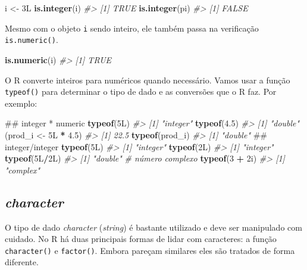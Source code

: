 \documentclass[]{book}
\newenvironment{Shaded}{\begin{snugshade}}{\end{snugshade}}
\newcommand{\KeywordTok}[1]{\textcolor[rgb]{0.13,0.29,0.53}{\textbf{#1}}}
\newcommand{\DecValTok}[1]{\textcolor[rgb]{0.00,0.00,0.81}{#1}}
\newcommand{\FloatTok}[1]{\textcolor[rgb]{0.00,0.00,0.81}{#1}}
\newcommand{\StringTok}[1]{\textcolor[rgb]{0.31,0.60,0.02}{#1}}
\newcommand{\CommentTok}[1]{\textcolor[rgb]{0.56,0.35,0.01}{\textit{#1}}}
\newcommand{\OperatorTok}[1]{\textcolor[rgb]{0.81,0.36,0.00}{\textbf{#1}}}
\newcommand{\NormalTok}[1]{#1}
\begin{document}
\begin{Shaded}
\begin{Highlighting}[]
\NormalTok{i <-}\StringTok{ }\NormalTok{3L}
\KeywordTok{is.integer}\NormalTok{(i)}
\CommentTok{#> [1] TRUE}
\KeywordTok{is.integer}\NormalTok{(pi)}
\CommentTok{#> [1] FALSE}
\end{Highlighting}
\end{Shaded}

Mesmo com o objeto \texttt{i} sendo inteiro, ele também passa na
verificação \texttt{is.numeric()}.

\begin{Shaded}
\begin{Highlighting}[]
\KeywordTok{is.numeric}\NormalTok{(i)}
\CommentTok{#> [1] TRUE}
\end{Highlighting}
\end{Shaded}

O R converte inteiros para numéricos quando necessário. Vamos usar a
função \texttt{typeof()} para determinar o tipo de dado e as conversões
que o R faz. Por exemplo:

\begin{Shaded}
\begin{Highlighting}[]
\NormalTok{## integer * numeric}
\KeywordTok{typeof}\NormalTok{(5L)}
\CommentTok{#> [1] "integer"}
\KeywordTok{typeof}\NormalTok{(}\FloatTok{4.5}\NormalTok{)}
\CommentTok{#> [1] "double"}
\NormalTok{(prod_i <-}\StringTok{ }\NormalTok{5L }\OperatorTok{*}\StringTok{ }\FloatTok{4.5}\NormalTok{)}
\CommentTok{#> [1] 22.5}
\KeywordTok{typeof}\NormalTok{(prod_i)}
\CommentTok{#> [1] "double"}
\NormalTok{## integer/integer}
\KeywordTok{typeof}\NormalTok{(5L)}
\CommentTok{#> [1] "integer"}
\KeywordTok{typeof}\NormalTok{(2L)}
\CommentTok{#> [1] "integer"}
\KeywordTok{typeof}\NormalTok{(5L}\OperatorTok{/}\NormalTok{2L)}
\CommentTok{#> [1] "double"}
\CommentTok{# número complexo}
\KeywordTok{typeof}\NormalTok{(}\DecValTok{3} \OperatorTok{+}\StringTok{ }\NormalTok{2i)}
\CommentTok{#> [1] "complex"}
\end{Highlighting}
\end{Shaded}

\subsection{\texorpdfstring{\emph{character}}{character}}\label{character}

O tipo de dado \emph{character} (\emph{string}) é bastante utilizado e
deve ser manipulado com cuidado. No R há duas principais formas de lidar
com caracteres: a função \texttt{character()} e \texttt{factor()}.
Embora pareçam similares eles são tratados de forma diferente.
\end{document}
